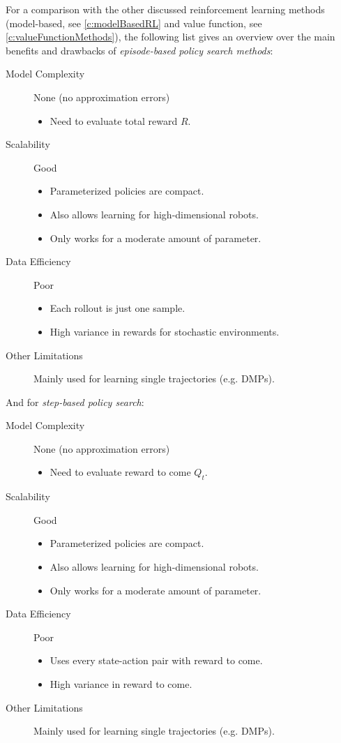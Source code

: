 		For a comparison with the other discussed reinforcement learning methods (model-based, see \autoref{c:modelBasedRL} and value function, see \autoref{c:valueFunctionMethods}), the following list gives an overview over the main benefits and drawbacks of \emph{episode-based policy search methods}:
		\begin{description}
			\item[Model Complexity] None (no approximation errors)
				\begin{itemize}
					\item Need to evaluate total reward \( R \).
				\end{itemize}
			\item[Scalability] Good
				\begin{itemize}
					\item Parameterized policies are compact.
					\item Also allows learning for high-dimensional robots.
					\item Only works for a moderate amount of parameter.
				\end{itemize}
			\item[Data Efficiency] Poor
				\begin{itemize}
					\item Each rollout is just one sample.
					\item High variance in rewards for stochastic environments.
				\end{itemize}
			\item[Other Limitations] Mainly used for learning single trajectories (e.g. DMPs).
		\end{description}
		And for \emph{step-based policy search}:
		\begin{description}
			\item[Model Complexity] None (no approximation errors)
				\begin{itemize}
					\item Need to evaluate reward to come \( Q_t \).
				\end{itemize}
			\item[Scalability] Good
				\begin{itemize}
					\item Parameterized policies are compact.
					\item Also allows learning for high-dimensional robots.
					\item Only works for a moderate amount of parameter.
				\end{itemize}
			\item[Data Efficiency] Poor
				\begin{itemize}
					\item Uses every state-action pair with reward to come.
					\item High variance in reward to come.
				\end{itemize}
			\item[Other Limitations] Mainly used for learning single trajectories (e.g. DMPs).
		\end{description}

